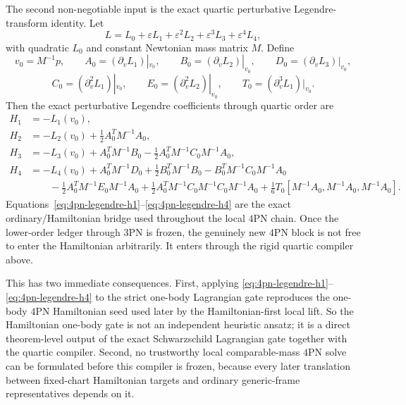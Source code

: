 \documentclass[11pt]{article}
\begin{document}
The second non-negotiable input is the exact quartic perturbative
Legendre-transform identity.  Let
\begin{equation}
L=L_0+\varepsilon L_1+\varepsilon^2L_2+\varepsilon^3L_3+\varepsilon^4L_4,
\label{eq:4pn-legendre-expansion}
\end{equation}
with quadratic $L_0$ and constant Newtonian mass matrix $M$.  Define
\begin{equation}
v_0=M^{-1}p,
\qquad
A_0=(\partial_vL_1)|_{v_0},
\qquad
B_0=(\partial_vL_2)|_{v_0},
\qquad
D_0=(\partial_vL_3)|_{v_0},
\label{eq:4pn-legendre-first-derivatives}
\end{equation}
\begin{equation}
C_0=(\partial_v^2L_1)|_{v_0},
\qquad
E_0=(\partial_v^2L_2)|_{v_0},
\qquad
T_0=(\partial_v^3L_1)|_{v_0}.
\label{eq:4pn-legendre-higher-derivatives}
\end{equation}
Then the exact perturbative Legendre coefficients through quartic order are
\begin{align}
H_1 &= -L_1(v_0),
\label{eq:4pn-legendre-h1}\\
H_2 &= -L_2(v_0)+\frac12A_0^TM^{-1}A_0,
\label{eq:4pn-legendre-h2}\\
H_3 &= -L_3(v_0)+A_0^TM^{-1}B_0-\frac12A_0^TM^{-1}C_0M^{-1}A_0,
\label{eq:4pn-legendre-h3}\\
H_4 &= -L_4(v_0)
+A_0^TM^{-1}D_0
+\frac12B_0^TM^{-1}B_0
-B_0^TM^{-1}C_0M^{-1}A_0
\nonumber\\
&\hspace{2em}
-\frac12A_0^TM^{-1}E_0M^{-1}A_0
+\frac12A_0^TM^{-1}C_0M^{-1}C_0M^{-1}A_0
+\frac16T_0[M^{-1}A_0,M^{-1}A_0,M^{-1}A_0].
\label{eq:4pn-legendre-h4}
\end{align}
Equations~\eqref{eq:4pn-legendre-h1}--\eqref{eq:4pn-legendre-h4} are the exact
ordinary/Hamiltonian bridge used throughout the local $4$PN chain.  Once the
lower-order ledger through $3$PN is frozen, the genuinely new $4$PN block is
not free to enter the Hamiltonian arbitrarily.  It enters through the rigid
quartic compiler above.

This has two immediate consequences.  First, applying
\eqref{eq:4pn-legendre-h1}--\eqref{eq:4pn-legendre-h4} to the strict one-body
Lagrangian gate reproduces the one-body $4$PN Hamiltonian seed used later by the
Hamiltonian-first local lift.  So the Hamiltonian one-body gate is not an
independent heuristic ansatz; it is a direct theorem-level output of the exact
Schwarzschild Lagrangian gate together with the quartic compiler.  Second, no
trustworthy local comparable-mass $4$PN solve can be formulated before this
compiler is frozen, because every later translation between fixed-chart
Hamiltonian targets and ordinary generic-frame representatives depends on it.
\end{document}
